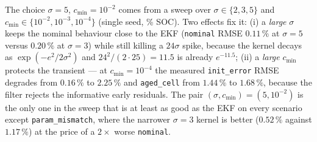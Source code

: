 The choice $\sigma=5$, $c_{\min}=10^{-2}$ comes from a sweep over
$\sigma\in\{2,3,5\}$ and $c_{\min}\in\{10^{-2},10^{-3},10^{-4}\}$ (single seed, \% SOC).  Two
effects fix it: (i) a \emph{large} $\sigma$ keeps the nominal behaviour close to the EKF
(\texttt{nominal} RMSE $0.11\,\%$ at $\sigma=5$ versus $0.20\,\%$ at $\sigma=3$) while still
killing a $24\sigma$ spike, because the kernel decays as $\exp(-e^2/2\sigma^2)$ and
$24^2/(2\cdot25)=11.5$ is already $e^{-11.5}$; (ii) a \emph{large} $c_{\min}$ protects the
transient --- at $c_{\min}=10^{-4}$ the measured \texttt{init\_error} RMSE degrades from
$0.16\,\%$ to $2.25\,\%$ and \texttt{aged\_cell} from $1.44\,\%$ to $1.68\,\%$, because the filter
rejects the informative early residuals.  The pair
$(\sigma,c_{\min})=(5,10^{-2})$ is the only one in the sweep that is at least as good as the EKF
on every scenario except \texttt{param\_mismatch}, where the narrower $\sigma=3$ kernel is better
($0.52\,\%$ against $1.17\,\%$) at the price of a $2\times$ worse \texttt{nominal}.

